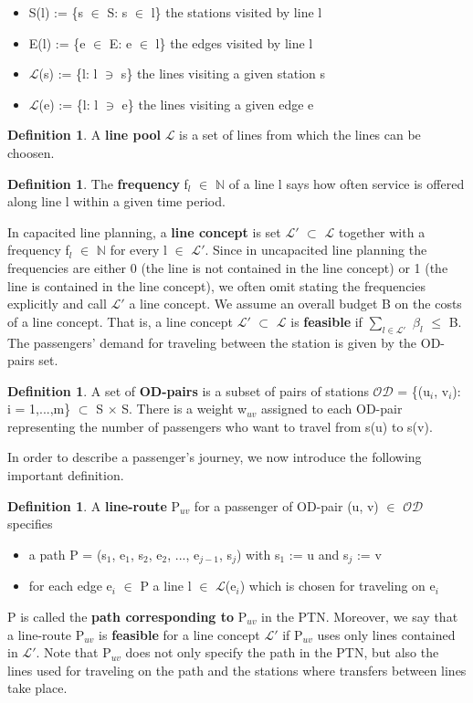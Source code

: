 \documentclass[
  twoside,
  11pt, a4paper,
  footinclude=true,
  headinclude=true,
  cleardoublepage=empty
]{scrbook}
\theoremstyle{definition}
\newtheorem{definition}[theorem]{Definition}
\begin{document}
\begin{itemize}
\item S(l) := \{s $\in$ S: s $\in$ l\} the stations visited by line l
\item E(l) := \{e $\in$ E: e $\in$ l\} the edges visited by line l
\item $\mathcal{L}$(s) := \{l: l $\ni$ s\} the lines visiting a given station s
\item $\mathcal{L}$(e) := \{l: l $\ni$ e\} the lines visiting a given edge e
\end{itemize}
\begin{definition}
A \textbf{line pool} $\mathcal{L}$ is a set of lines from which the lines can be choosen.
\end{definition}
\begin{definition}
The \textbf{frequency} f$_l$ $\in$ $\mathbb{N}$ of a line l says how often service is offered along line l within a given time period. 
\end{definition}
In capacited line planning, a \textbf{line concept} is  set $\mathcal{L'}$ $\subset$ $\mathcal{L}$ together with a frequency f$_l$  $\in$ $\mathbb{N}$ for every l $\in$ $\mathcal{L'}$. Since in uncapacited line planning the frequencies are either 0 (the line is not contained in the line concept) or 1 (the line is contained in the line concept), we often omit stating the frequencies explicitly and call $\mathcal{L'}$ a line concept. \newline
We assume an overall budget B on the costs of a line concept. That is, a line concept $\mathcal{L'}$ $\subset$ $\mathcal{L}$ is \textbf{feasible} if $\sum_{l\in\mathcal{L'}}$ $\beta_l$ $\le$ B. \newline 
The passengers' demand for traveling between the station is given by the OD-pairs set.
\begin{definition}
A set of \textbf{OD-pairs} is a subset of pairs of stations $\mathcal{OD}$ = \{(u$_i$, v$_i$): i = 1,...,m\} $\subset$ S $\times$ S. There is a weight w$_{uv}$ assigned to each OD-pair representing the number of passengers who want to travel from s(u) to s(v).
\end{definition}
In order to describe a passenger's journey, we now introduce the following important definition.
\begin{definition}
A \textbf{line-route} P$_{uv}$ for a passenger of OD-pair (u, v) $\in$ $\mathcal{OD}$ specifies
\begin{itemize}
\item a path P = (s$_1$, e$_1$, s$_2$, e$_2$, ..., e$_{j-1}$, s$_j$) with s$_1$ := u and s$_j$ := v
\item for each edge e$_i$ $\in$ P a line l $\in$ $\mathcal{L}$(e$_i$) which is chosen for traveling on e$_i$
\end{itemize}
P is called the \textbf{path corresponding to} P$_{uv}$ in the PTN. Moreover, we say that a line-route P$_{uv}$ is \textbf{feasible} for a line concept $\mathcal{L'}$ if P$_{uv}$  uses only lines contained in $\mathcal{L'}$. Note that P$_{uv}$ does not only specify the path in the PTN, but also the lines used for traveling on the path and the stations where transfers between lines take place.
\end{definition}
\end{document}
